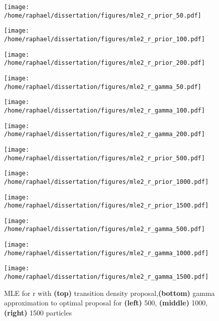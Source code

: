 \documentclass{article}
\begin{document}
	
	\begin{figure}[htb]
		\centering
		\begin{minipage}{0.3\textwidth}
			\centering
			\texttt{[image: /home/raphael/dissertation/figures/mle2\_r\_prior\_50.pdf]}
		\end{minipage}
		\begin{minipage}{.3\textwidth}
			\centering
			\texttt{[image: /home/raphael/dissertation/figures/mle2\_r\_prior\_100.pdf]}
		\end{minipage}
		\begin{minipage}{0.3\textwidth}
			\centering
			\texttt{[image: /home/raphael/dissertation/figures/mle2\_r\_prior\_200.pdf]}
		\end{minipage}
		\begin{minipage}{0.3\textwidth}
			\centering
			\texttt{[image: /home/raphael/dissertation/figures/mle2\_r\_gamma\_50.pdf]}
		\end{minipage}
		\begin{minipage}{.3\textwidth}
			\centering
			\texttt{[image: /home/raphael/dissertation/figures/mle2\_r\_gamma\_100.pdf]}
		\end{minipage}
		\begin{minipage}{.3\textwidth}
			\centering
			\texttt{[image: /home/raphael/dissertation/figures/mle2\_r\_gamma\_200.pdf]}
		\end{minipage}
		\begin{minipage}{0.3\textwidth}
			\centering
			\texttt{[image: /home/raphael/dissertation/figures/mle2\_r\_prior\_500.pdf]}
		\end{minipage}
		\begin{minipage}{.3\textwidth}
			\centering
			\texttt{[image: /home/raphael/dissertation/figures/mle2\_r\_prior\_1000.pdf]}
		\end{minipage}
		\begin{minipage}{.3\textwidth}
			\centering
			\texttt{[image: /home/raphael/dissertation/figures/mle2\_r\_prior\_1500.pdf]}
		\end{minipage}
		\begin{minipage}{.3\textwidth}
			\centering
			\texttt{[image: /home/raphael/dissertation/figures/mle2\_r\_gamma\_500.pdf]}
		\end{minipage}
		\begin{minipage}{.3\textwidth}
			\centering
			\texttt{[image: /home/raphael/dissertation/figures/mle2\_r\_gamma\_1000.pdf]}
		\end{minipage}
		\begin{minipage}{.3\textwidth}
			\centering
			\texttt{[image: /home/raphael/dissertation/figures/mle2\_r\_gamma\_1500.pdf]}
		\end{minipage}
		\caption{MLE for r with \textbf{(top)} transition density proposal,\textbf{(bottom)} gamma approximation to optimal proposal for \textbf{(left)} 500, \textbf{(middle)} 1000, \textbf{(right)} 1500 particles}
		\label{fig:comparisonr}
	\end{figure}
	
\end{document}
